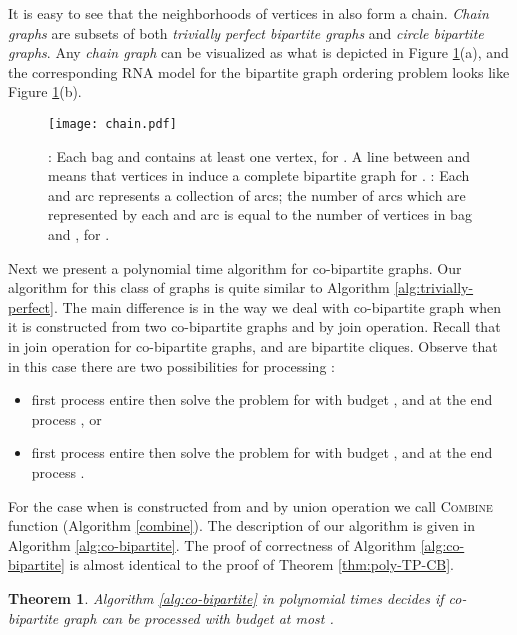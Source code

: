 \documentclass[letterpaper,11pt,abstracton]{scrartcl}
\newtheorem{tm}[theorem]{Theorem}
\begin{document}
It is easy to see that the neighborhoods of
vertices in  also form a chain. \textit{Chain graphs} are subsets of
both \textit{trivially perfect bipartite graphs} and \textit{circle bipartite graphs}.
Any \textit{chain graph} can be visualized as what is
depicted in Figure \ref{fig:4}(a), and the corresponding RNA model for the bipartite graph ordering problem looks like Figure \ref{fig:4}(b).


\begin{figure}[htbp]
\begin{center}
\texttt{[image: chain.pdf]}
\caption{
: Each bag  and  contains at least one vertex, for .
A line between  and  means that vertices in  induce a complete bipartite graph for .
 :
Each  and  arc represents a collection of arcs; the number of arcs which are represented by each  and  arc is equal to the number of
vertices in bag  and , for .
}
\label{fig:4}
\end{center}
\end{figure}


Next we present a polynomial time algorithm for co-bipartite graphs. Our algorithm for this class of graphs is quite similar to Algorithm \ref{alg:trivially-perfect}. The main difference is in the way we deal with co-bipartite graph  when it is constructed from two co-bipartite graphs  and  by join operation. Recall that in join operation for co-bipartite graphs,  and  are bipartite cliques. Observe that in this case there are two possibilities for processing :
\begin{itemize}
\item first process entire  then solve the problem for  with budget , and at the end process , or
\item first process entire  then solve the problem for  with budget , and at the end process .
\end{itemize}

For the case when  is constructed from  and  by union operation we call \textsc{Combine} function (Algorithm \ref{combine}). The description of our algorithm is given in Algorithm \ref{alg:co-bipartite}. The proof of correctness of Algorithm \ref{alg:co-bipartite} is almost identical to the proof of Theorem \ref{thm:poly-TP-CB}.

\begin{tm}
Algorithm \ref{alg:co-bipartite} in polynomial times decides if co-bipartite graph  can be processed with budget at most .
\end{tm}
\end{document}
